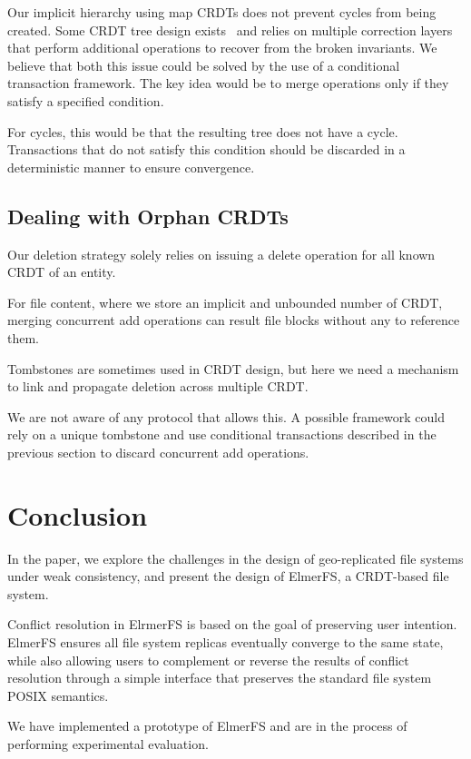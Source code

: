 \documentclass[sigconf,anonymous,10pt]{acmart}
\begin{document}
Our implicit hierarchy using map CRDTs does not prevent cycles from being created.
Some CRDT tree design exists~\cite{martin2012abstract} and relies on multiple correction
layers that perform additional operations to recover from the broken invariants.
We believe that both this issue could be solved by the use of a conditional transaction framework.
The key idea would be to merge operations only if they satisfy a specified condition.

For cycles, this would be that the resulting tree does not have a cycle.
Transactions that do not satisfy this condition should be discarded
in a deterministic manner to ensure convergence.

\subsection{Dealing with Orphan CRDTs}

Our deletion strategy solely relies on issuing a delete operation for all
known CRDT of an entity.

For file content, where we store an implicit and unbounded number of CRDT,
merging concurrent add operations can result file blocks without any to reference them.

Tombstones are sometimes used in CRDT design, but here we need a mechanism
to link and propagate deletion across multiple CRDT.

We are not aware of any protocol that allows this.
A possible framework could rely on a unique tombstone and use conditional
transactions described in the previous section to discard concurrent
add operations.

\section{Conclusion}

In the paper, we explore the challenges in the design of geo-replicated file
systems under weak consistency,
and present the design of ElmerFS, a CRDT-based file system.

Conflict resolution in ElrmerFS is based on the goal of preserving user
intention.
ElmerFS ensures all file system replicas eventually converge to the same state,
while also allowing users to complement or reverse the results of conflict resolution
through a simple interface that preserves the standard file system POSIX semantics.

We have implemented a prototype of ElmerFS and are in the process of performing
experimental evaluation.
\end{document}
